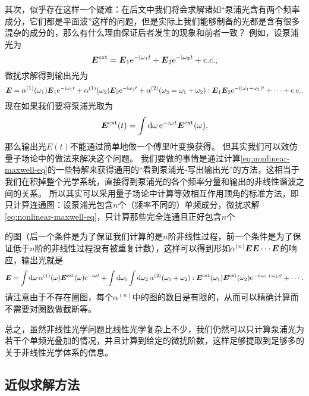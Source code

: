\documentclass[UTF8, a4paper]{ctexart}
\newcommand*{\ee}{\mathrm{e}}
\newcommand*{\ii}{\mathrm{i}}
\begin{document}
其次，似乎存在这样一个疑难：在后文中我们将会求解诸如“泵浦光含有两个频率成分，它们都是平面波”这样的问题，但是实际上我们能够制备的光都是含有很多混杂的成分的，那么有什么理由保证后者发生的现象和前者一致？
例如，设泵浦光为
\[
    \vb*{E}^\text{ext} = \vb*{E}_1 \ee^{-\ii \omega_1 t} + \vb*{E}_2 \ee^{-\ii \omega_2 t} + \text{c.c.},
\]
微扰求解得到输出光为
\[
    \vb*{E} = \alpha^{(1)}(\omega_1) \vb*{E}_1 \ee^{-\ii \omega_1 t} + \alpha^{(1)}(\omega_2) \vb*{E}_2 \ee^{-\ii \omega_2 t} + \alpha^{(2)}(\omega_3 = \omega_1 + \omega_2) : \vb*{E}_1 \vb*{E}_2 \ee^{-\ii (\omega_1 + \omega_2) t} + \cdots + \text{c.c.}.
\]
现在如果我们要将泵浦光取为
\[
    \vb*{E}^\text{ext}(t) = \int \dd{\omega} \ee^{-\ii \omega t} \vb*{E}^\text{ext}(\omega),
\]
那么输出光$E(t)$不能通过简单地做一个傅里叶变换获得。
但其实我们可以效仿量子场论中的做法来解决这个问题。
我们要做的事情是通过计算\eqref{eq:nonlinear-maxwell-eq}的一些特解来获得通用的“看到泵浦光-写出输出光”的方法，这相当于我们在积掉整个光学系统，直接得到泵浦光的各个频率分量和输出的非线性谐波之间的关系。
所以其实可以采用量子场论中计算等效相互作用顶角的标准方法，即只计算连通图：设泵浦光包含$n$个（频率不同的）单频成分，微扰求解\eqref{eq:nonlinear-maxwell-eq}，只计算那些完全连通且正好包含$n$个的图（后一个条件是为了保证我们计算的是$n$阶非线性过程，前一个条件是为了保证低于$n$阶的非线性过程没有被重复计数），这样可以得到形如$\alpha^{(n)} \vb*{E} \vb*{E} \cdots \vb*{E}$的响应，输出光就是
\[
    \vb*{E} = \int \dd{\omega} \alpha^{(1)}(\omega) \vb*{E}^\text{ext}(\omega) \ee^{-\ii \omega t} + \int \dd{\omega_1} \int \dd{\omega_2} \alpha^{(2)}(\omega_1 + \omega_2) : \vb*{E}^\text{ext}(\omega_1) \vb*{E}^\text{ext}(\omega_2) \ee^{-\ii (\omega_1 + \omega_2) t} + \cdots.
\]
请注意由于不存在圈图，每个$\alpha^{(n)}$中的图的数目是有限的，从而可以精确计算而不需要对圈数做截断等。

总之，虽然非线性光学问题比线性光学复杂上不少，我们仍然可以只计算泵浦光为若干个单频光叠加的情况，并且计算到给定的微扰阶数，这样足够提取到足够多的关于非线性光学体系的信息。

\subsection{近似求解方法}
\end{document}
